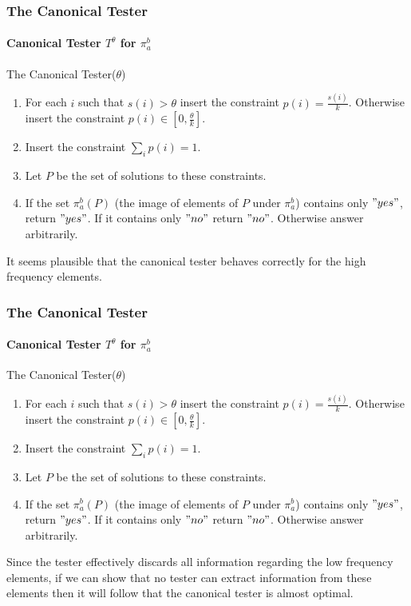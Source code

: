 \documentclass{beamer}
\begin{document}
\begin{frame}
  \frametitle{The Canonical Tester} \framesubtitle{Canonical Tester
    $T^\theta$ for $\pi_a^b$}
  \begin{block}{The Canonical Tester($\theta$)}
    \begin{enumerate}
    \item For each $i$ such that $s(i)>\theta$ insert the constraint
      $p(i)=\frac{s(i)}{k}$. Otherwise insert the constraint $p(i)\in
      [0,\frac{\theta}{k}]$.
    \item Insert the constraint $\sum_ip(i)=1$.
    \item Let $P$ be the set of solutions to these constraints.
    \item If the set $\pi_a^b(P)$ (the image of elements of $P$ under
      $\pi_a^b$) contains only $"yes"$, return $"yes"$. If it contains
      only $"no"$ return $"no"$. Otherwise answer arbitrarily.
    \end{enumerate}
  \end{block}  
  It seems plausible that the canonical tester behaves correctly for
  the high frequency elements.
\end{frame}
\begin{frame}
  \frametitle{The Canonical Tester} \framesubtitle{Canonical Tester
    $T^\theta$ for $\pi_a^b$}
  \begin{block}{The Canonical Tester($\theta$)}
    \begin{enumerate}
    \item For each $i$ such that $s(i)>\theta$ insert the constraint
      $p(i)=\frac{s(i)}{k}$. Otherwise insert the constraint $p(i)\in
      [0,\frac{\theta}{k}]$.
    \item Insert the constraint $\sum_ip(i)=1$.
    \item Let $P$ be the set of solutions to these constraints.
    \item If the set $\pi_a^b(P)$ (the image of elements of $P$ under
      $\pi_a^b$) contains only $"yes"$, return $"yes"$. If it contains
      only $"no"$ return $"no"$. Otherwise answer arbitrarily.
    \end{enumerate}
  \end{block}
  Since the tester effectively discards all information regarding the
  low frequency elements, if we can show that no tester can extract
  information from these elements then it will follow that the
  canonical tester is almost optimal.
\end{frame}
\end{document}
